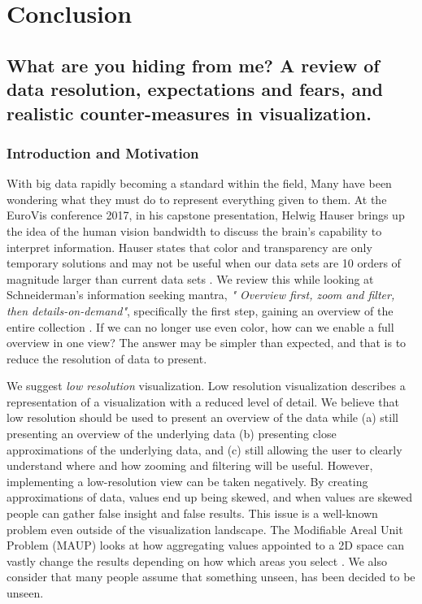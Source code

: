 \chapter{Conclusion}
\label{chap:conclusion}

\newpage
{\footnotesize \hypersetup{linkcolor=black}
\minitoc}

\section{What are you hiding from me? A review of data resolution, expectations and fears, and realistic counter-measures in visualization.}
\subsection{Introduction and Motivation}
With big data rapidly becoming a standard within the field, Many have been wondering what they must do to represent everything given to them. At the EuroVis conference 2017, in his capstone presentation, Helwig Hauser brings up the idea of the human vision bandwidth to discuss the brain's capability to interpret information. Hauser states that color and transparency are only temporary solutions and may not be useful when our data sets are 10 orders of magnitude larger than current data sets \cite{hauser2019from}. We review this while looking at Schneiderman's information seeking mantra, \emph{" Overview first, zoom and filter, then details-on-demand"}, specifically the first step, gaining an overview of the entire collection \cite{shneiderman1996eyes}. If we can no longer use even color, how can we enable a full overview in one view? The answer may be simpler than expected, and that is to reduce the resolution of data to present.

We suggest \textit{low resolution} visualization. Low resolution visualization describes a representation of a visualization with a reduced level of detail. We believe that low resolution should be used to present an overview of the data while (a) still presenting an overview of the underlying data (b) presenting close approximations of the underlying data, and (c) still allowing the user to clearly understand where and how zooming and filtering will be useful. However, implementing a low-resolution view can be taken negatively. By creating approximations of data, values end up being skewed, and when values are skewed people can gather false insight and false results. This issue is a well-known problem even outside of the visualization landscape. The Modifiable Areal Unit Problem (MAUP) looks at how aggregating values appointed to a 2D space can vastly change the results depending on how which areas you select \cite{openshaw1984modifiable}.
We also consider that many people assume that something unseen, has been decided to be unseen.

